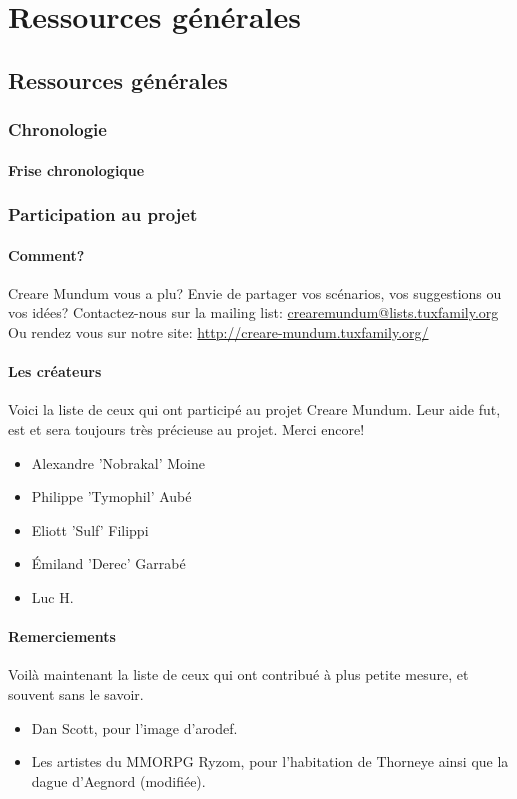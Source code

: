 \documentclass{book}
\begin{document}
\part{Ressources générales}
\chapter*{Ressources générales}
\section{Chronologie}
\subsection{Frise chronologique}

\newpage
\section{Participation au projet}
\subsection{Comment?}
\hypertarget{participation}{}
Creare Mundum vous a plu? 
Envie de partager vos scénarios, vos suggestions ou vos idées?
\newline
Contactez-nous sur la mailing list: \href {mailto:crearemundum@lists.tuxfamily.org}{crearemundum@lists.tuxfamily.org}
\newline
Ou rendez vous sur notre site: \href {http://creare-mundum.tuxfamily.org/} {http://creare-mundum.tuxfamily.org/}
\subsection{Les créateurs}
Voici la liste de ceux qui ont participé au projet Creare Mundum. Leur aide fut, est et sera toujours très précieuse au projet. Merci encore!  
\begin{itemize}
\item Alexandre ’Nobrakal’ Moine 
\item Philippe ’Tymophil’ Aubé 
\item Eliott ’Sulf’ Filippi
\item Émiland ’Derec’ Garrabé
\item Luc H.
\end{itemize}
\subsection{Remerciements}
Voilà maintenant la liste de ceux qui ont contribué à plus petite mesure, et souvent sans le savoir. 
\begin{itemize}
\item Dan Scott, pour l’image d’arodef.
\item Les artistes du MMORPG Ryzom, pour l'habitation de Thorneye ainsi que la dague d'Aegnord (modifiée). 
\end{itemize}
\end{document}
